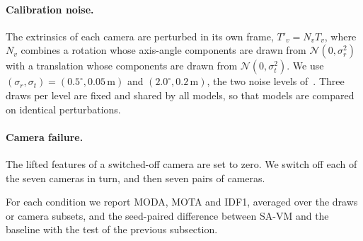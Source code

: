 \documentclass[10pt,twocolumn,letterpaper]{article}
\begin{document}
\paragraph{Calibration noise.} The extrinsics of each camera are perturbed in its own frame, $T'_v = N_v T_v$, where
$N_v$ combines a rotation whose axis-angle components are drawn from $\mathcal{N}(0, \sigma_r^2)$ with a translation
whose components are drawn from $\mathcal{N}(0, \sigma_t^2)$. We use
$(\sigma_r, \sigma_t) = (0.5^\circ, 0.05\,\mathrm{m})$ and $(2.0^\circ, 0.2\,\mathrm{m})$, the two noise levels
of~\cite[Tab.~5]{toida2025atlasfusion}. Three draws per level are fixed and shared by all models, so that models are
compared on identical perturbations.

\paragraph{Camera failure.} The lifted features of a switched-off camera are set to zero. We switch off each of the
seven cameras in turn, and then seven pairs of cameras.

For each condition we report MODA, MOTA and IDF1, averaged over the draws or camera subsets, and the seed-paired
difference between SA-VM and the baseline with the test of the previous subsection.
\end{document}
